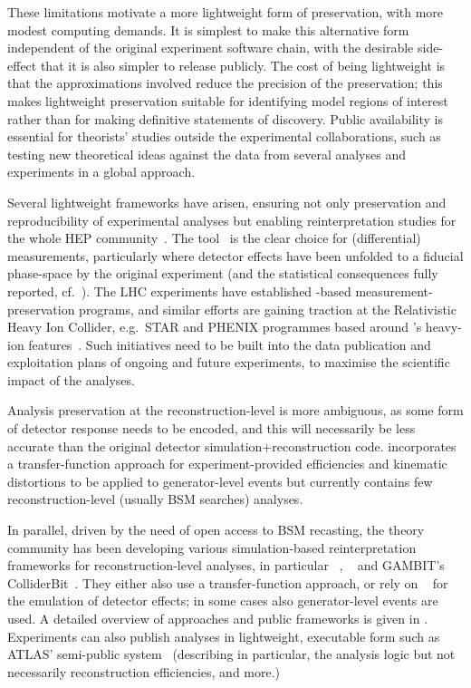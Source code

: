 \documentclass[11pt]{article}
\begin{document}
These limitations motivate a more lightweight form of preservation, with more modest computing demands. It is simplest to make this alternative form independent of the original experiment software chain, with the desirable side-effect that it is also simpler to release publicly. The cost of being lightweight is that the approximations involved reduce the precision of the preservation; this makes lightweight preservation suitable for identifying model regions of interest rather than for making definitive statements of discovery. Public availability is essential for theorists' studies outside the experimental collaborations, such as testing new theoretical ideas against the data from several analyses and experiments in a global approach.

Several lightweight frameworks have arisen, ensuring not only preservation and reproducibility of experimental analyses but enabling \gls{reinterpretation} studies for the whole \gls{HEP} community~\cite{LHCReinterpretationForum:2020xtr}. The \rivet tool~\cite{Bierlich:2019rhm} is the clear choice for (differential) measurements, particularly where detector effects have been unfolded to a fiducial phase-space by the original experiment (and the statistical consequences fully reported, cf.~). The \gls{LHC} experiments have established \rivet-based measurement-preservation programs, and similar efforts are gaining traction at the Relativistic Heavy Ion Collider, e.g.~\gls{STAR} and \gls{PHENIX} programmes based around \rivet's heavy-ion features~\cite{Bierlich:2020wms}. Such initiatives need to be built into the data publication and exploitation plans of ongoing and future experiments, to maximise the scientific impact of the analyses.

Analysis preservation at the reconstruction-level is more ambiguous, as some form of detector response needs to be encoded, and this will necessarily be less accurate than the original detector simulation+reconstruction code.
\rivet incorporates a transfer-function approach for experiment-provided efficiencies and kinematic distortions to be applied to generator-level events but currently contains few reconstruction-level (usually \gls{BSM} searches) analyses.

In parallel, driven by the need of open access to \gls{BSM} recasting, the theory community has been developing various simulation-based reinterpretation frameworks for reconstruction-level analyses, in particular \checkmate~\cite{Drees:2013wra,Dercks:2016npn}, \madanalysis~\cite{Dumont:2014tja,Conte:2018vmg} and GAMBIT's ColliderBit~\cite{GAMBIT:2017qxg}. They either also use a transfer-function approach, or rely on \delphes~\cite{deFavereau:2013fsa} for the emulation of detector effects; in some cases also generator-level events are used. A detailed overview of approaches and public frameworks is given in \cite{LHCReinterpretationForum:2020xtr}.
%
Experiments can also publish analyses in lightweight, executable form such as \gls{ATLAS}' semi-public \simpleanalysis system~\cite{atlas:simpleanalysis}
(describing in particular, the analysis logic but not necessarily reconstruction efficiencies, and more.)
\end{document}
